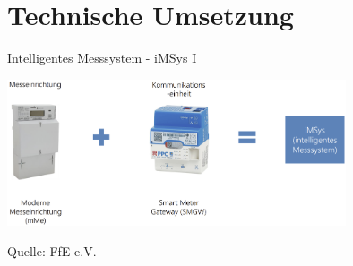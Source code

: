 \section{Technische Umsetzung}

\begin{frame}{Intelligentes Messsystem - iMSys I}
   \begin{center}
      \includegraphics[width=10cm]{images/iMSys.png}
   \end{center}
   Quelle: FfE e.V.\cite{FFE2020imsys}
\end{frame}


